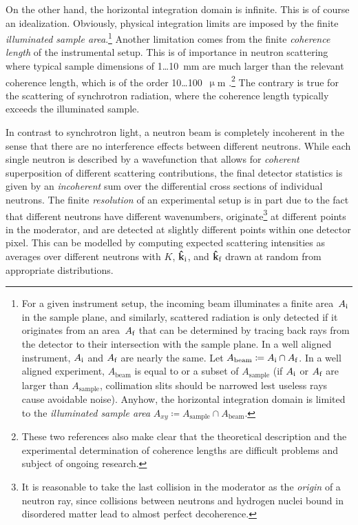 On the other hand, the horizontal integration domain is infinite.
This is of course an idealization.
Obviously, physical integration limits are imposed by the finite
\textit{illuminated sample area}.\footnote
{For a given instrument setup,
the incoming beam illuminates a finite area~$A_{\text{i}}$ in the sample plane,
and similarly, scattered radiation is only detected if it originates
from an area~$A_{\text{f}}$ that can be determined
by tracing back rays from the detector
to their intersection with the sample plane.
In a well aligned instrument, $A_{\text{i}}$ and $A_{\text{f}}$ are nearly the same.
Let $A_\text{beam}\coloneqq A_{\text{i}}\cap A_{\text{f}}$.
In a well aligned experiment,
$A_\text{beam}$ is equal to or a subset of $A_\text{sample}$
(if $A_{\text{i}}$ or $A_{\text{f}}$ are larger than $A_\text{sample}$,
collimation slits should be narrowed
lest useless rays cause avoidable noise).
Anyhow, the horizontal integration domain
is limited to the \textit{illuminated sample area}
$A_{xy}\coloneqq A_\text{sample}\cap A_\text{beam}$.}
%
%
Another limitation comes from the finite \textit{coherence length}
of the instrumental setup.
%
This is of importance in neutron scattering
where typical sample dimensions of 1\ldots10~mm
are much larger than the relevant coherence length,
which is of the order 10\ldots100~$\upmu$m \cite{HaPR10,MaMM14}.\footnote
{These two references also make clear that
  the theoretical description and the experimental determination of
  coherence lengths are difficult problems and subject of ongoing research.}
The contrary is true for the scattering of synchrotron radiation,
where the coherence length typically exceeds the illuminated sample.

In contrast to synchrotron light,
a neutron beam is completely incoherent in the sense
that there are no interference effects between different neutrons.
While each single neutron is described by a wavefunction
that allows for \textit{coherent} superposition of
different scattering contributions,
the final detector statistics
%
is given by an \textit{incoherent} sum
over the differential cross sections of individual neutrons.
The finite \textit{resolution}
%
of an experimental setup is in part due to the fact that
different neutrons have different wavenumbers,
originate\footnote
{It is reasonable to take the last collision in the moderator
  as the \textit{origin} of a neutron ray,
  since collisions between neutrons and hydrogen nuclei bound in
  disordered matter lead to almost perfect decoherence.}
at different points in the moderator,
and are detected at slightly different points within one detector pixel.
This can be modelled by computing expected scattering intensities as
averages over different neutrons with 
$K$, $\mathbf{\hat k}_{\text{i}}$, and $\mathbf{\hat k}_{\text{f}}$ drawn at random
from appropriate distributions.

